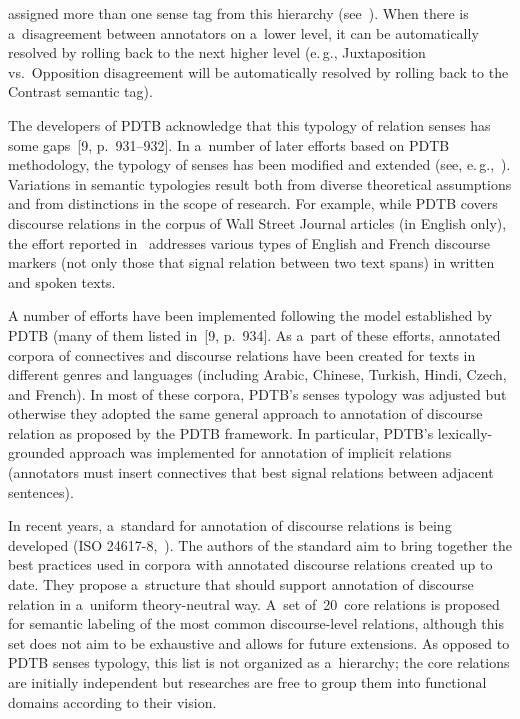 \begin{multicols}{2}

\noindent
 assigned more than one sense tag 
from this hierarchy (see~\cite{8-kr}). When there is a~disagreement between 
annotators on a~lower level, it can be automatically resolved by rolling back to the 
next higher level (e.\,g., Juxtaposition vs.\ Opposition disagreement will be 
automatically resolved by rolling back to the Contrast semantic tag).
  

  
  The developers of PDTB acknowledge that this typology of relation senses has 
some gaps~[9, p.~931--932]. In a~number of later efforts based on PDTB 
methodology, the typology of senses has been modified and extended 
 (see, e.\,g.,~\cite{10-kr, 11-kr, 12-kr}). Variations in semantic typologies result both 
from diverse theoretical assumptions and from distinctions in the scope of research. 
For example, while PDTB covers discourse relations in the corpus of Wall Street 
Journal articles (in English only), the effort reported in~\cite{12-kr} addresses 
various types of English and French discourse markers (not only those that signal 
relation between two text spans) in written and spoken texts.
{

}
  
  A number of efforts have been implemented following the model established by 
PDTB (many of them listed in~[9,  p.~934]. As a~part of these efforts, 
annotated corpora of connectives and discourse relations have been created for texts 
in different genres and languages (including Arabic, Chinese, Turkish, Hindi, Czech, 
and French). In most of these corpora, PDTB's senses typology was adjusted but 
otherwise they adopted the same general approach to annotation of discourse relation 
as proposed by the PDTB framework. In particular, PDTB's lexically-grounded approach 
was implemented for annotation of implicit relations (annotators must insert 
connectives that best signal relations between adjacent sentences). 
  
  In recent years, a~standard for annotation of discourse relations is being developed 
(ISO 24617-8,~\cite{13-kr}). The authors of the standard aim to bring together the 
best practices used in corpora with annotated discourse relations created up to date. 
They propose a~structure that should support annotation of discourse relation in 
a~uniform theory-neutral way. A~set of~20~core relations is proposed for semantic 
labeling of the most common discourse-level relations, although this set does not aim 
to be exhaustive and allows for future extensions. As opposed to PDTB senses 
typology, this list is not organized as a~hierarchy; the core relations are initially 
independent but researches are free to group them into functional domains according 
to their vision.
  

\end{multicols}
